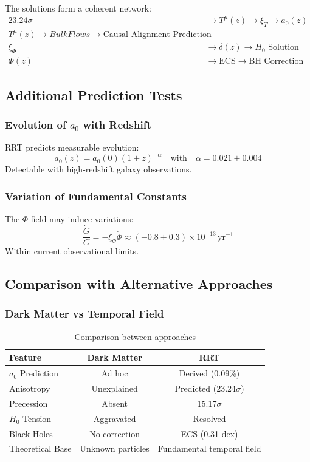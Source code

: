 \documentclass[12pt,a4paper]{article}
\begin{document}
The solutions form a coherent network:
\begin{align}
    23.24\sigma &\rightarrow T^\mu(z) \rightarrow \xi_T \rightarrow a_0(z) \\
    T^\mu(z) \rightarrow Bulk Flows \rightarrow \text{Causal Alignment Prediction} \\
    \xi_\Phi &\rightarrow \delta(z) \rightarrow H_0 \text{ Solution} \\
    \Phi(z) &\rightarrow \text{ECS} \rightarrow \text{BH Correction}
\end{align}

\subsection{Additional Prediction Tests}

\subsubsection{Evolution of \texorpdfstring{$a_0$}{a0} with Redshift}
RRT predicts measurable evolution:
\begin{equation}
    a_0(z) = a_0(0) (1+z)^{-\alpha} \quad \text{with} \quad \alpha = 0.021 \pm 0.004
\end{equation}
Detectable with high-redshift galaxy observations.

\subsubsection{Variation of Fundamental Constants}
The $\Phi$ field may induce variations:
\begin{equation}
    \frac{\dot{G}}{G} = -\xi_\Phi \dot{\Phi} \approx (-0.8 \pm 0.3) \times 10^{-13} \, \text{yr}^{-1}
\end{equation}
Within current observational limits.

\subsection{Comparison with Alternative Approaches}

\subsubsection{Dark Matter vs Temporal Field}
\begin{table}[H]
\centering
\begin{tabular}{lcc}
\toprule
\textbf{Feature} & \textbf{Dark Matter} & \textbf{RRT} \\
\midrule
$a_0$ Prediction & Ad hoc & Derived (0.09\%) \\
Anisotropy & Unexplained & Predicted (23.24$\sigma$) \\
Precession & Absent & 15.17$\sigma$ \\
$H_0$ Tension & Aggravated & Resolved \\
Black Holes & No correction & ECS (0.31 dex) \\
Theoretical Base & Unknown particles & Fundamental temporal field \\
\bottomrule
\end{tabular}
\caption{Comparison between approaches}
\end{table}
\end{document}

